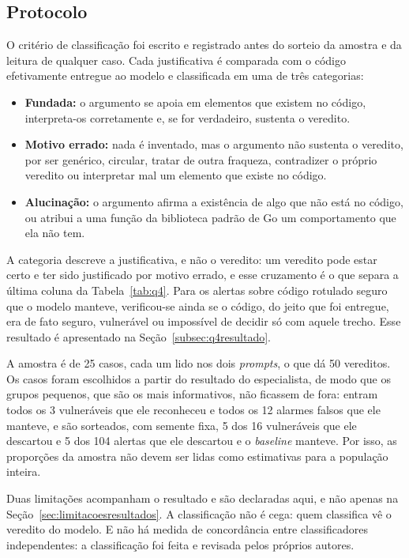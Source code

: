 \subsection{Protocolo}
\label{subsec:q4protocolo}

O critério de classificação foi escrito e registrado antes do sorteio da amostra e da leitura de qualquer caso. Cada justificativa é comparada com o código efetivamente entregue ao modelo e classificada em uma de três categorias:
\begin{itemize}
    \item \textbf{Fundada:} o argumento se apoia em elementos que existem no código, interpreta-os corretamente e, se for verdadeiro, sustenta o veredito.
    \item \textbf{Motivo errado:} nada é inventado, mas o argumento não sustenta o veredito, por ser genérico, circular, tratar de outra fraqueza, contradizer o próprio veredito ou interpretar mal um elemento que existe no código.
    \item \textbf{Alucinação:} o argumento afirma a existência de algo que não está no código, ou atribui a uma função da biblioteca padrão de Go um comportamento que ela não tem.
\end{itemize}

A categoria descreve a justificativa, e não o veredito: um veredito pode estar certo e ter sido justificado por motivo errado, e esse cruzamento é o que separa a última coluna da Tabela~\ref{tab:q4}. Para os alertas sobre código rotulado seguro que o modelo manteve, verificou-se ainda se o código, do jeito que foi entregue, era de fato seguro, vulnerável ou impossível de decidir só com aquele trecho. Esse resultado é apresentado na Seção~\ref{subsec:q4resultado}.

A amostra é de 25 casos, cada um lido nos dois \textit{prompts}, o que dá 50 vereditos. Os casos foram escolhidos a partir do resultado do especialista, de modo que os grupos pequenos, que são os mais informativos, não ficassem de fora: entram todos os 3 vulneráveis que ele reconheceu e todos os 12 alarmes falsos que ele manteve, e são sorteados, com semente fixa, 5 dos 16 vulneráveis que ele descartou e 5 dos 104 alertas que ele descartou e o \textit{baseline} manteve. Por isso, as proporções da amostra não devem ser lidas como estimativas para a população inteira.

Duas limitações acompanham o resultado e são declaradas aqui, e não apenas na Seção~\ref{sec:limitacoesresultados}. A classificação não é cega: quem classifica vê o veredito do modelo. E não há medida de concordância entre classificadores independentes: a classificação foi feita e revisada pelos próprios autores.

